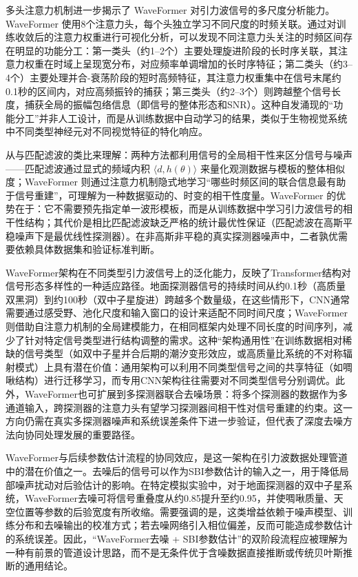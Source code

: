 多头注意力机制进一步揭示了 WaveFormer 对引力波信号的多尺度分析能力。WaveFormer 使用8个注意力头，每个头独立学习不同尺度的时频关联。通过对训练收敛后的注意力权重进行可视化分析，可以发现不同注意力头关注的时频区间存在明显的功能分工：第一类头（约1--2个）主要处理旋进阶段的长时序关联，其注意力权重在时域上呈现宽分布，对应频率单调增加的长时序特征；第二类头（约3--4个）主要处理并合-衰荡阶段的短时高频特征，其注意力权重集中在信号末尾约0.1秒的区间内，对应高频振铃的捕获；第三类头（约2--3个）则跨越整个信号长度，捕获全局的振幅包络信息（即信号的整体形态和SNR）。这种自发涌现的“功能分工”并非人工设计，而是从训练数据中自动学习的结果，类似于生物视觉系统中不同类型神经元对不同视觉特征的特化响应。

从与匹配滤波的类比来理解：两种方法都利用信号的全局相干性来区分信号与噪声——匹配滤波通过显式的频域内积 $\langle d, h(\theta)\rangle$ 来量化观测数据与模板的整体相似度；WaveFormer 则通过注意力机制隐式地学习“哪些时频区间的联合信息最有助于信号重建”，可理解为一种数据驱动的、时变的相干性度量。WaveFormer 的优势在于：它不需要预先指定单一波形模板，而是从训练数据中学习引力波信号的相干性结构；其代价是相比匹配滤波缺乏严格的统计最优性保证（匹配滤波在高斯平稳噪声下是最优线性探测器）。在非高斯非平稳的真实探测器噪声中，二者孰优需要依赖具体数据集和验证标准判断。

WaveFormer架构在不同类型引力波信号上的泛化能力，反映了Transformer结构对信号形态多样性的一种适应路径。地面探测器信号的持续时间从约0.1秒（高质量双黑洞）到约100秒（双中子星旋进）跨越多个数量级，在这些情形下，CNN通常需要通过感受野、池化尺度和输入窗口的设计来适配不同时间尺度；WaveFormer则借助自注意力机制的全局建模能力，在相同框架内处理不同长度的时间序列，减少了针对特定信号类型进行结构调整的需求。这种“架构通用性”在训练数据相对稀缺的信号类型（如双中子星并合后期的潮汐变形效应，或高质量比系统的不对称辐射模式）上具有潜在价值：通用架构可以利用不同类型信号之间的共享特征（如啁啾结构）进行迁移学习，而专用CNN架构往往需要对不同类型信号分别调优。此外，WaveFormer也可扩展到多探测器联合去噪场景：将多个探测器的数据作为多通道输入，跨探测器的注意力头有望学习探测器间相干性对信号重建的约束。这一方向仍需在真实多探测器噪声和系统误差条件下进一步验证，但代表了深度去噪方法向协同处理发展的重要路径。

WaveFormer与后续参数估计流程的协同效应，是这一架构在引力波数据处理管道中的潜在价值之一。去噪后的信号可以作为SBI参数估计的输入之一，用于降低局部噪声扰动对后验估计的影响。在特定模拟实验中，对于地面探测器的双中子星系统，WaveFormer去噪可将信号重叠度从约0.85提升至约0.95，并使啁啾质量、天空位置等参数的后验宽度有所收缩。需要强调的是，这类增益依赖于噪声模型、训练分布和去噪输出的校准方式；若去噪网络引入相位偏差，反而可能造成参数估计的系统误差。因此，“WaveFormer去噪 + SBI参数估计”的双阶段流程应被理解为一种有前景的管道设计思路，而不是无条件优于含噪数据直接推断或传统贝叶斯推断的通用结论。


